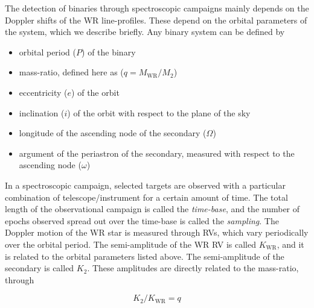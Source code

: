 The detection of binaries through spectroscopic campaigns mainly depends on the Doppler shifts of the WR line-profiles. These depend on the orbital parameters of the system, which we describe briefly. Any binary system can be defined by

\begin{itemize}
    \item orbital period ($P$) of the binary
    \item mass-ratio, defined here as ($q = M_{\textrm{WR}}/M_2$)
    \item eccentricity ($e$) of the orbit
    \item inclination ($i$) of the orbit with respect to the plane of the sky
    \item longitude of the ascending node of the secondary ($\Omega$)
    \item argument of the periastron of the secondary, measured with respect to the ascending node ($\omega$)
\end{itemize}

In a spectroscopic campaign, selected targets are observed with a particular combination of telescope/instrument for a certain amount of time. The total length of the observational campaign is called the \textit{time-base}, and the number of epochs observed spread out over the time-base is called the \textit{sampling}. The Doppler motion of the WR star is measured through RVs, which vary periodically over the orbital period. The semi-amplitude of the WR RV is called $K_{\textrm{WR}}$, and it is related to the orbital parameters listed above. The semi-amplitude of the secondary is called $K_2$. These amplitudes are directly related to the mass-ratio, through

\begin{equation}
    K_2/K_{\textrm{WR}} = q
\end{equation}

